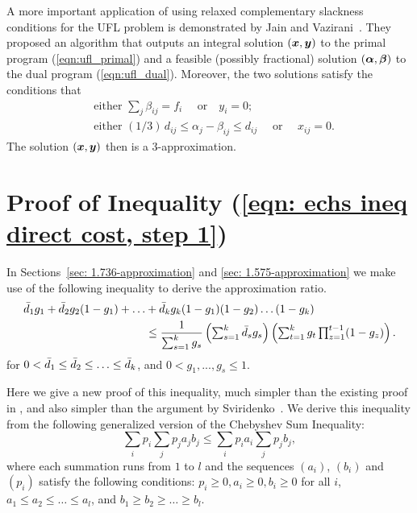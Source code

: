 \documentclass[oneside,final]{ucr}
\begin{document}
A more important application of using relaxed complementary
slackness conditions for the UFL problem is demonstrated by
Jain and Vazirani~\cite{JainV01}. They proposed an algorithm
that outputs an integral solution $(\boldsymbol{x}, \boldsymbol{y})$ to the
primal program (\ref{eqn:ufl_primal}) and a feasible
(possibly fractional) solution $(\boldsymbol{\alpha},\boldsymbol{\beta})$ to the
dual program (\ref{eqn:ufl_dual}). Moreover, the two
solutions satisfy the conditions that
\begin{align*}
  &\text{either } \sum_{j} \beta_{ij} = f_i  \quad \text{ or
} \quad y_i = 0;\\
  &\text{either } (1/3)\, d_{ij} \leq \alpha_j - \beta_{ij}
  \leq d_{ij} \quad \text{ or } \quad x_{ij} = 0.
\end{align*}
The solution $(\boldsymbol{x},\boldsymbol{y})$ then is a $3$-approximation.

\section{Proof of Inequality (\ref{eqn: echs ineq direct
    cost, step 1})}
\label{sec: ECHSinequality}

In Sections~\ref{sec: 1.736-approximation} and \ref{sec:
  1.575-approximation} we make use of the following
inequality to derive the approximation ratio.
%
\begin{align}
  \label{eq:min expected distance}
  {\bar d}_1 g_1 + {\bar d}_2 g_2 (1-g_1) +
  \ldots &+ {\bar d}_k g_k (1-g_1) (1-g_2) \ldots (1-g_k)\\ \notag
  &\leq \frac{1}{\sum_{s=1}^k g_s} \left(\textstyle\sum_{s=1}^k {\bar d}_s g_s\right)\left(\textstyle\sum_{t=1}^k g_t \textstyle\prod_{z=1}^{t-1} (1-g_z)\right).
\end{align}
%
for $0 < {\bar d}_1\leq {\bar d}_2 \leq \ldots \leq {\bar d}_k$, and
$0 < g_1,...,g_s \le 1$.

\medskip

Here we give a new proof of this inequality, much simpler
than the existing proof in \cite{ChudakS04}, and also
simpler than the argument by Sviridenko~\cite{Svi02}.  We
derive this inequality from the following generalized
version of the Chebyshev Sum Inequality:
%
\begin{equation}
  \label{eq:cheby}
  \textstyle{\sum_{i}} p_i \textstyle{\sum_j} p_j a_j b_j \leq \textstyle{\sum_i} p_i a_i \textstyle{\sum_j} p_j b_j,
\end{equation}
%
where each summation runs from $1$ to $l$ and the sequences
$(a_i)$, $(b_i)$ and $(p_i)$ satisfy the following
conditions: $p_i\geq 0, a_i \geq 0, b_i \geq 0$ for all $i$,
$a_1\leq a_2 \leq \ldots \leq a_l$, and $b_1 \geq b_2 \geq
\ldots \geq b_l$.
\end{document}

